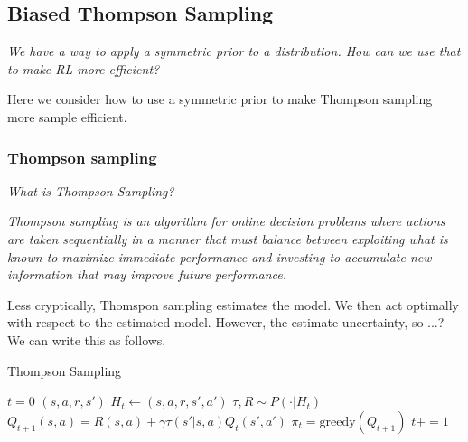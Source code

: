 \subsection{Biased Thompson Sampling} \label{thompson-sampling}

\begin{displayquote}
\textsl{We have a way to apply a symmetric prior to a distribution.
How can we use that to make RL more efficient?}
\end{displayquote}

Here we consider how to use a symmetric prior to make Thompson sampling more sample efficient.

\subsubsection{Thompson sampling} \label{ts}
\begin{displayquote}
	\textsl{What is Thompson Sampling?}
\end{displayquote}

\begin{displayquote}
	\textit{Thompson sampling is an algorithm for online decision problems where actions are taken sequentially in a manner that
must balance between exploiting what is known to maximize immediate performance and investing to accumulate
new information that may improve future performance.}\cite{Russo2017}
\end{displayquote}

Less cryptically, Thomspon sampling estimates the model. We then act optimally with respect to the estimated model. However, the estimate uncertainty, so ...? We can write this as follows.

\begin{algorithm}
	\caption{Thompson Sampling}
	\begin{algorithmic}[1]

		\State $t=0$
		\State $(s, a, r, s')$ 
		\State $H_t \leftarrow (s, a, r, s', a')$ 
		\State $\tau, R \sim P(\cdot | H_t)$ 
		\State $Q_{t+1}(s, a) = R(s, a) + \gamma \tau(s'| s, a) Q_t(s', a')$ 
		\State $\pi_t = \text{greedy}(Q_{t+1})$ 
		\State $t += 1$

		\EndWhile
		\State {}
		\EndProcedure

	\end{algorithmic}
\end{algorithm}

